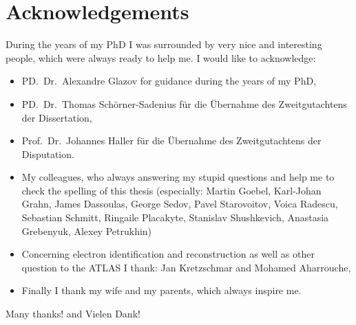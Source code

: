 \documentclass[oneside,11pt]{Classes/PhDthesisPSnPDF}
\begin{document}
\section*{Acknowledgements}

During the years of my PhD I was surrounded by very nice and interesting people, which were always ready to help me. I would like to acknowledge:

\begin{itemize}
\item PD.~Dr.~Alexandre Glazov for guidance during the years of my PhD,
\item PD.~Dr.~Thomas Sch\"orner-Sadenius f\"ur die \"Ubernahme des Zweitgutachtens der Dissertation,
\item Prof.~Dr.~Johannes Haller f\"ur die \"Ubernahme des Zweitgutachtens der Disputation.
\item My colleagues, who always answering my stupid questions and help me to check the spelling of this thesis (especially: Martin Goebel,  Karl-Johan Grahn, James Dassoulas, George Sedov, Pavel Starovoitov, Voica Radescu, Sebastian Schmitt, Ringaile Placakyte, Stanislav Shushkevich, Anastasia Grebenyuk, Alexey Petrukhin)
\item Concerning electron identification and reconstruction as well as other question to the ATLAS I thank: Jan Kretzschmar and Mohamed Aharrouche,
\item Finally I thank my wife and my parents, which always inspire me.
\end{itemize}
Many thanks! and Vielen Dank!
\end{document}
